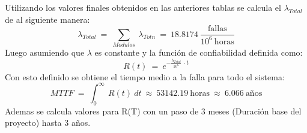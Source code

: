 Utilizando los valores finales obtenidos en las anteriores tablas se calcula el $\lambda_{Total}$ de al siguiente manera:
\begin{equation}
\lambda_{Total} \ = \  \sum_{Modulos} \  \lambda_{Totn}  \  =  \ 18.8174 \  \frac{\text{fallas}}{10^6 \ \text{horas}}
\end{equation}
Luego asumiendo que $\lambda$ es constante y la función de confiabilidad definida como:
\begin{equation}
R(t) \ = \ e^{-\frac{\lambda_{Total}}{10^6}\ \cdot t}
\end{equation}
Con esto definido se obtiene el tiempo medio a la falla para todo el sistema:
\begin{equation}
MTTF \ = \ \int_0^\infty \ R(t)\ dt \ \approx \ 53142.19 \ \text{horas} \ \approx \ 6.066 \ \text{años}
\end{equation}
Ademas se calcula valores para R(T) con un paso de 3 meses (Duración base del proyecto) hasta 3 años.
